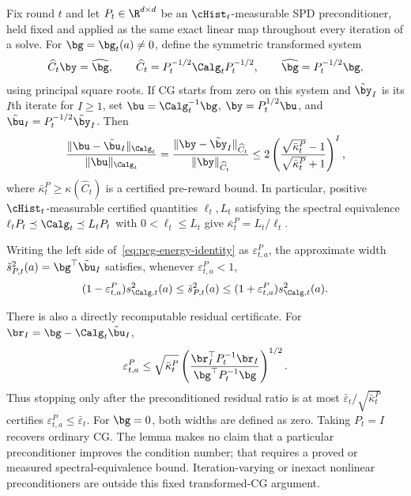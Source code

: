 \iflegacyextras
\begin{lemma}\label{lem:pcg}
Fix round $t$ and let $P_t\in\R^{d\times d}$ be an
$\cHist_t$-measurable SPD preconditioner, held fixed and applied as the same
exact linear map throughout every iteration of a solve.  For
$\bg=\bg_t(a)\ne0$, define the symmetric transformed system
\begin{equation}\label{eq:pcg-transformed-system}
 \widehat C_t\by=\widehat\bg,\qquad
 \widehat C_t=P_t^{-1/2}\Calg_tP_t^{-1/2},\qquad
 \widehat\bg=P_t^{-1/2}\bg,
\end{equation}
using principal square roots.  If CG starts from zero on this system and
$\tilde\by_I$ is its $I$th iterate for $I\ge1$, set
$\bu=\Calg_t^{-1}\bg$, $\by=P_t^{1/2}\bu$, and
$\tilde\bu_I=P_t^{-1/2}\tilde\by_I$.  Then
\begin{equation}\label{eq:pcg-energy-identity}
 \frac{\|\bu-\tilde\bu_I\|_{\Calg_t}}{\|\bu\|_{\Calg_t}}
 =\frac{\|\by-\tilde\by_I\|_{\widehat C_t}}
 {\|\by\|_{\widehat C_t}}
 \le2\left(\frac{\sqrt{\bar\kappa_t^P}-1}
 {\sqrt{\bar\kappa_t^P}+1}\right)^I,
\end{equation}
where
$\bar\kappa_t^P\ge\kappa(\widehat C_t)$ is a certified pre-reward bound.
In particular, positive $\cHist_t$-measurable certified quantities
$\ell_t,L_t$ satisfying the spectral equivalence
$\ell_tP_t\preceq\Calg_t\preceq L_tP_t$ with
$0<\ell_t\le L_t$ give
$\bar\kappa_t^P=L_t/\ell_t$.

Writing the left side of~\eqref{eq:pcg-energy-identity} as
$\varepsilon_{t,a}^P$, the approximate width
$\tilde s_{P,t}^2(a)=\bg^\top\tilde\bu_I$ satisfies, whenever
$\varepsilon_{t,a}^P<1$,
\begin{equation}\label{eq:pcg-width-sandwich}
 (1-\varepsilon_{t,a}^P)s_{\Calg,t}^2(a)
 \le\tilde s_{P,t}^2(a)
 \le(1+\varepsilon_{t,a}^P)s_{\Calg,t}^2(a).
\end{equation}

There is also a directly recomputable residual certificate.  For
$\br_I=\bg-\Calg_t\tilde\bu_I$,
\begin{equation}\label{eq:pcg-residual-certificate}
 \varepsilon_{t,a}^P
 \le\sqrt{\bar\kappa_t^P}
 \left(\frac{\br_I^\top P_t^{-1}\br_I}
 {\bg^\top P_t^{-1}\bg}\right)^{1/2}.
\end{equation}
Thus stopping only after the preconditioned residual ratio is at most
$\bar\varepsilon_t/\sqrt{\bar\kappa_t^P}$ certifies
$\varepsilon_{t,a}^P\le\bar\varepsilon_t$.  For $\bg=0$, both widths are
defined as zero.  Taking $P_t=I$ recovers ordinary CG.  The lemma makes no
claim that a particular preconditioner improves the condition number; that
requires a proved or measured spectral-equivalence bound.  Iteration-varying
or inexact nonlinear preconditioners are outside this fixed transformed-CG
argument.
\end{lemma}

